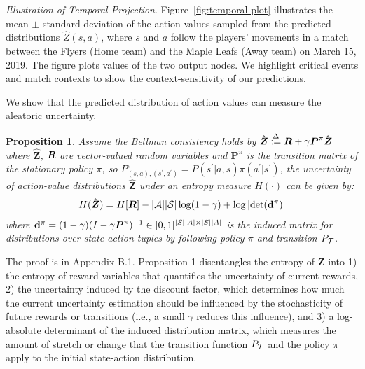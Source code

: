 \documentclass{article}
\newcommand{\state}{s}
\newcommand{\action}{a}
\newcommand{\transition}{t}
\newcommand{\reward}{r}
\newtheorem{proposition}{Proposition}
\begin{document}
{\it Illustration of Temporal Projection}. Figure~\ref{fig:temporal-plot} illustrates the mean $\pm$ standard deviation of the action-values sampled from the predicted distributions $\hat{Z}(\state,\action)$, where $\state$ and $\action$ follow the players' movements in a match between the Flyers (Home team) and the Maple Leafs (Away team) on March 15, 2019. The figure plots values
of the two output nodes. We highlight critical events and
match contexts to show the context-sensitivity of our predictions. 

We show that the predicted distribution of action values can measure the aleatoric uncertainty.

\begin{proposition}
Assume the Bellman consistency holds by $\hat{\boldsymbol{Z}} \overset{\Delta}{:=} \MakeUppercase{\boldsymbol{\reward}} + \gamma \boldsymbol{P}^{\pi}\hat{\boldsymbol{Z}}$ 
where $\hat{\boldsymbol{Z}}$, $\boldsymbol{\MakeUppercase{\reward}}$ are vector-valued random variables and $\boldsymbol{P}^{\pi}$ is the transition matrix of the stationary policy $\pi$, so $P^{\pi}_{(\state,\action),(\state^{\prime},\action^{\prime})}=P(\state^{\prime}|\action,\state)\pi(\action^{\prime}|\state^{\prime})$, the uncertainty of action-value distributions $\hat{\boldsymbol{Z}}$ under an entropy measure $H(\cdot)$ can be given by:
\begin{align}
    H(\hat{\boldsymbol{Z}}) = H[\boldsymbol{\MakeUppercase{\reward}}]-|\mathcal{\MakeUppercase{\action}}||\mathcal{\MakeUppercase{\state}}|\log(1-\gamma)+\log|\text{det}(\mathbf{d}^{\pi})|
\end{align}
where $\mathbf{d}^{\pi}=(1-\gamma)(I-\gamma \boldsymbol{P}^{\pi})^{-1}\in[0,1]^{|\MakeUppercase{\state}||\MakeUppercase{\action}|\times|\MakeUppercase{\state}||\MakeUppercase{\action}|}$ is the induced matrix for distributions over state-action tuples by following policy $\pi$ and transition $P_{\mathcal{\MakeUppercase{t}}}$. 
\end{proposition}

The proof is in Appendix B.1. Proposition 1 disentangles the entropy of $\boldsymbol{Z}$ into 1) the entropy of reward variables that quantifies the uncertainty of current rewards, 2) the uncertainty induced by the discount factor, which determines how much the current uncertainty estimation should be influenced by the stochasticity of future rewards or transitions (i.e., a small $\gamma$ reduces this influence), and 3) a log-absolute determinant of the induced distribution matrix, which measures the amount of stretch or change that the transition function $P_{\mathcal{\MakeUppercase{\transition}}}$ and the policy $\pi$ apply to the initial state-action distribution.
\end{document}
